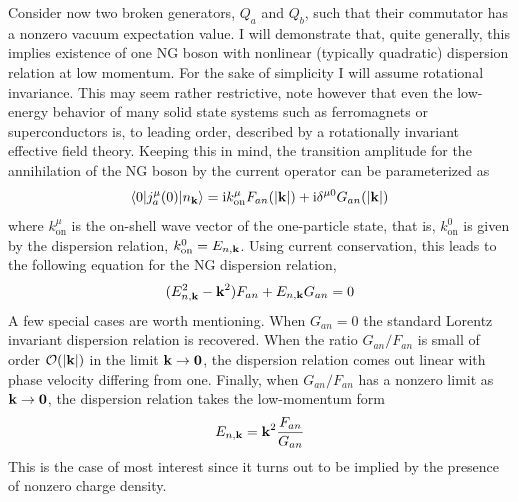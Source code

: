 \documentclass[final,3p,times,12pt,a4paper,sort&compress]{elsarticle}
\newcommand\vek[1]{{\boldsymbol{\bf #1}}}   %
\newcommand\bra[1]{\langle#1\vert}          %
\newcommand\ket[1]{\vert#1\rangle}          %
\newcommand\imag{\mathrm i}                 %
\newcommand\abs[1]{\left|#1\right|}         %
\begin{document}
Consider now two broken generators, $Q_a$ and $Q_b$, such that their commutator
has a nonzero vacuum expectation value. I will demonstrate that, quite
generally, this implies existence of one NG boson with nonlinear (typically
quadratic) dispersion relation at low momentum. For the sake of simplicity I
will assume rotational invariance. This may seem rather restrictive, note
however that even the low-energy behavior of many solid state systems such as
ferromagnets or superconductors is, to leading order, described by a
rotationally invariant effective field theory. Keeping this in mind, the
transition amplitude for the annihilation of the NG boson by the current
operator can be parameterized as
\begin{equation}
\bra0j^\mu_a(0)\ket{n_{\vek k}}=\imag k^\mu_{\text{on}} F_{an}(\abs{\vek
k})+\imag\delta^{\mu0}G_{an}(\abs{\vek k})
\label{current_amplitude}
\end{equation}
where $k^\mu_{\text{on}}$ is the on-shell wave vector of the one-particle
state, that is, $k^0_{\text{on}}$ is given by the dispersion relation,
$k^0_{\text{on}}=E_{n,\vek k}$. Using current conservation, this leads to the
following equation for the NG dispersion relation,
\begin{equation}
(E^2_{n,\vek k}-\vek k^2)F_{an}+E_{n,\vek k}G_{an}=0
\label{typeIIGBdisp}
\end{equation}
A few special cases  are worth mentioning. When $G_{an}=0$ the standard Lorentz
invariant dispersion relation is recovered. When the ratio $G_{an}/F_{an}$ is
small of order $\mathcal O(\abs{\vek k})$ in the limit $\vek k\to\vek0$, the
dispersion relation comes out linear with phase velocity differing from one.
Finally, when $G_{an}/F_{an}$ has a nonzero limit as $\vek k\to\vek0$, the
dispersion relation takes the low-momentum form
\begin{equation}
E_{n,\vek k}=\vek k^2\frac{F_{an}}{G_{an}}
\label{typeIIGBdisplowk}
\end{equation}
This is the case of most interest since it turns out to be implied by the
presence of nonzero charge density.
\end{document}
